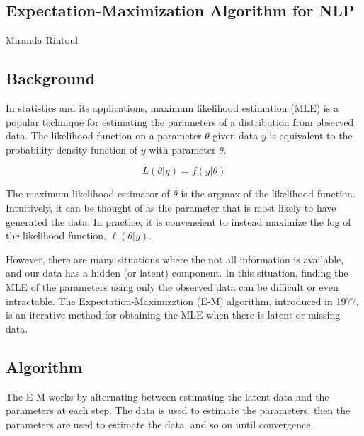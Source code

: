 \documentclass[14pt]{article}
\begin{document}

\begin{center}
\section*{Expectation-Maximization Algorithm for NLP}

Miranda Rintoul

\subsection*{Background}
\end{center}

In statistics and its applications, maximum likelihood estimation (MLE) is a popular technique for estimating the parameters of a distribution from observed data. The likelihood function on a parameter $\theta$ given data $y$ is equivalent to the probability density function of $y$ with parameter $\theta$.

$$L(\theta|y) = f(y|\theta)$$

The maximum likelihood estimator of $\theta$ is the argmax of the likelihood function.  Intuitively, it can be thought of as the parameter that is most likely to have generated the data.  In practice, it is conveneient to instead maximize the log of the likelihood function, $\ell(\theta|y)$.

However, there are many situations where the not all information is available, and our data has a hidden (or latent) component.  In this situation, finding the MLE of the parameters using only the observed data can be difficult or even intractable.  The Expectation-Maximizztion (E-M) algorithm, introduced in 1977, is an iterative method for obtaining the MLE when there is latent or missing data.

\begin{center}
\subsection*{Algorithm}
\end{center}

The E-M works by alternating between estimating the latent data and the parameters at each step.  The data is used to estimate the parameters, then the parameters are used to estimate the data, and so on until convergence.
\end{document}
